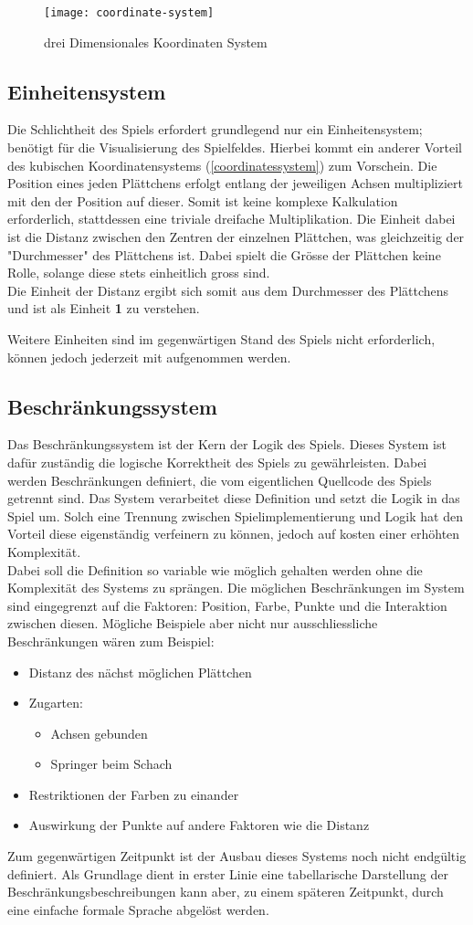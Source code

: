 \documentclass[../main.tex]{subfiles}
\begin{document}
	\begin{figure}[H]
		\centering
		\texttt{[image: coordinate-system]}
		\caption{drei Dimensionales Koordinaten System}
	\end{figure}
	
	\subsection{Einheitensystem}
	Die Schlichtheit des Spiels erfordert grundlegend nur ein Einheitensystem; benötigt für die Visualisierung des Spielfeldes. Hierbei kommt ein anderer Vorteil des kubischen Koordinatensystems (\ref{coordinatessystem}) zum Vorschein. Die Position eines jeden Plättchens erfolgt entlang der jeweiligen Achsen multipliziert mit den der Position auf dieser. Somit ist keine komplexe Kalkulation erforderlich, stattdessen eine triviale dreifache Multiplikation. Die Einheit dabei ist die Distanz zwischen den Zentren der einzelnen Plättchen, was gleichzeitig der "Durchmesser" des Plättchens ist. Dabei spielt die Grösse der Plättchen keine Rolle, solange diese stets einheitlich gross sind.\\
	Die Einheit der Distanz ergibt sich somit aus dem Durchmesser des Plättchens und ist als Einheit \textbf{1} zu verstehen.
	
	Weitere Einheiten sind im gegenwärtigen Stand des Spiels nicht erforderlich, können jedoch jederzeit mit aufgenommen werden. 
	
	\subsection{Beschränkungssystem}
	Das Beschränkungssystem ist der Kern der Logik des Spiels. Dieses System ist dafür zuständig die logische Korrektheit des Spiels zu gewährleisten. Dabei werden Beschränkungen definiert, die  vom eigentlichen Quellcode des Spiels getrennt sind. Das System verarbeitet diese Definition und setzt die Logik in das Spiel um. Solch eine Trennung zwischen Spielimplementierung und Logik hat den Vorteil diese eigenständig verfeinern zu können, jedoch auf kosten einer erhöhten Komplexität.\\
	Dabei soll die Definition so variable wie möglich gehalten werden ohne die Komplexität des Systems zu sprängen. Die möglichen Beschränkungen im System sind eingegrenzt auf die Faktoren: Position, Farbe, Punkte und die Interaktion zwischen diesen. Mögliche Beispiele aber nicht nur ausschliessliche Beschränkungen wären zum Beispiel:
	\begin{itemize}
		\item Distanz des nächst möglichen Plättchen
		\item Zugarten:
		\begin{itemize}
			\item Achsen gebunden
			\item Springer beim Schach
		\end{itemize}
		\item Restriktionen der Farben zu einander
		\item Auswirkung der Punkte auf andere Faktoren wie die Distanz
	\end{itemize}
	
	Zum gegenwärtigen Zeitpunkt ist der Ausbau dieses Systems noch nicht endgültig definiert. Als Grundlage dient in erster Linie eine tabellarische Darstellung der Beschränkungsbeschreibungen kann aber, zu einem späteren Zeitpunkt, durch eine einfache formale Sprache abgelöst werden.
	
	
\end{document}
